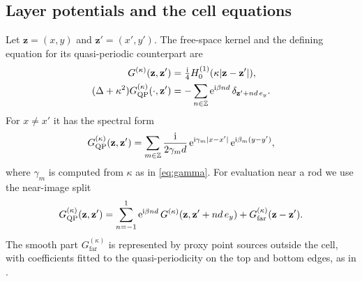\subsection{Layer potentials and the cell equations}\label{sec:layer}
Let $\mathbf z=(x,y)$ and $\mathbf z'=(x',y')$. The free-space kernel
and the defining equation for its quasi-periodic counterpart are
\[
 \begin{aligned}
 G^{(\kappa)}(\mathbf z,\mathbf z')&=\tfrac{\mathrm{i}}{4}
 H_0^{(1)}(\kappa|\mathbf z-\mathbf z'|),\\
 (\Delta+\kappa^2)G^{(\kappa)}_{\mathrm{QP}}(\cdot,\mathbf z')
 &=-\sum_{n\in\mathbb{Z}}\mathrm{e}^{\mathrm{i}\beta nd}\,\delta_{\mathbf z'+nd\,e_y}.
 \end{aligned}
\]
For $x\ne x'$ it has the spectral form
\cite{Linton1998}
\begin{equation}\label{eq:gqp-spectral}
  G^{(\kappa)}_{\mathrm{QP}}(\mathbf z,\mathbf z')=\sum_{m\in\mathbb{Z}}
  \frac{\mathrm{i}}{2\gamma_md}\,\mathrm{e}^{\mathrm{i}\gamma_m|x-x'|}\,\mathrm{e}^{\mathrm{i}\beta_m(y-y')},
\end{equation}
where $\gamma_m$ is computed from $\kappa$ as in \eqref{eq:gamma}. For
evaluation near a rod we use the near-image split
\begin{equation}\label{eq:near-image}
  G^{(\kappa)}_{\mathrm{QP}}(\mathbf z,\mathbf z')=\sum_{n=-1}^{1}\mathrm{e}^{\mathrm{i}\beta nd}\,
  G^{(\kappa)}(\mathbf z,\mathbf z'+nd\,e_y)+G^{(\kappa)}_{\mathrm{far}}(\mathbf z-\mathbf z').
\end{equation}
The smooth part $G^{(\kappa)}_{\mathrm{far}}$ is represented by proxy point
sources outside the cell, with coefficients fitted to the quasi-periodicity
on the top and bottom edges, as in
\cite{BarnettGreengard2010,BarnettGreengard2011,ChoBarnett2015}.

